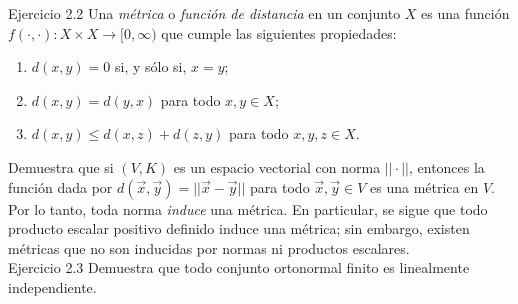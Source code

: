 \documentclass[12pt,dvipsnames]{article}
\numberwithin{equation}{section}
\begin{document}
Ejercicio 2.2 Una \emph{métrica} o \emph{función de distancia} en un conjunto $X$ es una función $f(\cdot, \cdot ):X\times X\to [0,\infty)$ que cumple las siguientes propiedades:
\begin{enumerate}[label=(\roman*)]
    \item $d(x,y)=0$ si, y sólo si, $x=y$;

    \item $d(x,y)=d(y,x)$ para todo $x,y\in X$;

    \item $d(x,y) \le d(x,z) + d(z,y)$ para todo $x,y,z\in X$.
\end{enumerate}

\noindent Demuestra que si $(V,K)$ es un espacio vectorial con norma $||\cdot||$, entonces la función dada por $d(\vec{x},\vec{y})=||\vec{x}-\vec{y}||$ para todo $\vec{x},\vec{y}\in V$ es una métrica en $V$. Por lo tanto, toda norma \emph{induce} una métrica. En particular, se sigue que todo producto escalar positivo definido induce una métrica; sin embargo, existen métricas que no son inducidas por normas ni productos escalares. \\

Ejercicio 2.3 Demuestra que todo conjunto ortonormal finito es linealmente independiente. \\

\end{document}
